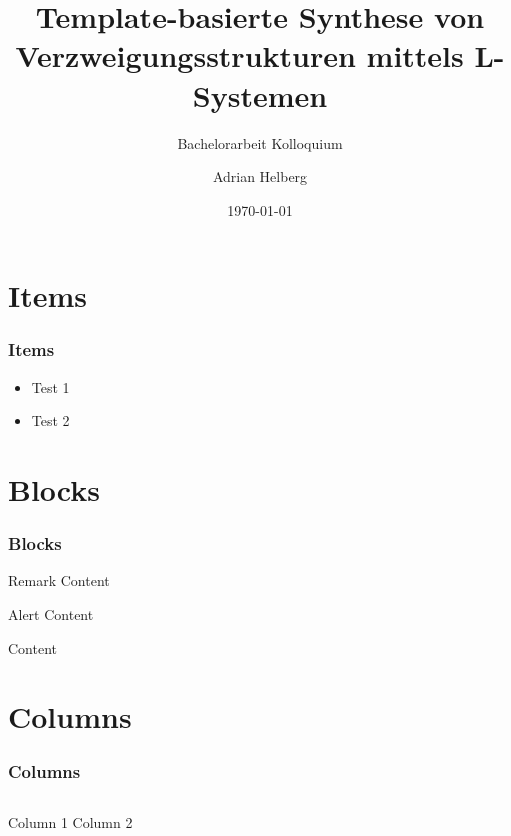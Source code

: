 \documentclass[12pt]{beamer}
\title{Template-basierte Synthese von Verzweigungsstrukturen mittels L-Systemen}
\subtitle{Bachelorarbeit Kolloquium}
\author{Adrian Helberg}
\institute{HAW Hamburg}
\date{\today}
\begin{document}
    \frame{\titlepage}

    \section{Items}
    \label{sec:items}
    \begin{frame}
        \frametitle{Items}

        \begin{itemize}
            \item<1-> Test 1
            \item<2-> Test 2
        \end{itemize}
    \end{frame}

    \section{Blocks}
    \label{sec:blocks}
    \begin{frame}
        \frametitle{Blocks}

        \begin{block}{Remark}
            Content
        \end{block}

        \begin{alertblock}{Alert}
            Content
        \end{alertblock}

        \begin{examples}
            Content
        \end{examples}
    \end{frame}

    \section{Columns}
    \label{sec:columns}
    \begin{frame}
        \frametitle{Columns}

        \begin{columns}
            Column 1
            Column 2
        \end{columns}

    \end{frame}
\end{document}
